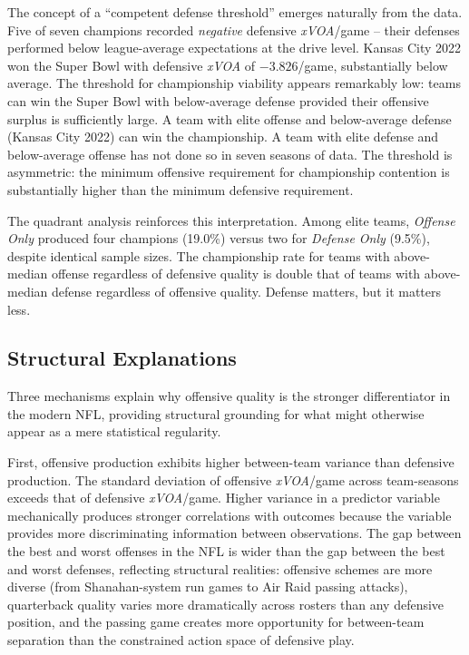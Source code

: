 \documentclass[12pt,a4paper]{article}
\newcommand{\xvoa}{\textit{xVOA}}
\begin{document}
The concept of a ``competent defense threshold'' emerges naturally from the data. Five of seven champions recorded \emph{negative} defensive \xvoa{}/game -- their defenses performed below league-average expectations at the drive level. Kansas City 2022 won the Super Bowl with defensive \xvoa{} of $-3.826$/game, substantially below average. The threshold for championship viability appears remarkably low: teams can win the Super Bowl with below-average defense provided their offensive surplus is sufficiently large. A team with elite offense and below-average defense (Kansas City 2022) can win the championship. A team with elite defense and below-average offense has not done so in seven seasons of data. The threshold is asymmetric: the minimum offensive requirement for championship contention is substantially higher than the minimum defensive requirement.

The quadrant analysis reinforces this interpretation. Among elite teams, \textit{Offense Only} produced four champions (19.0\%) versus two for \textit{Defense Only} (9.5\%), despite identical sample sizes. The championship rate for teams with above-median offense regardless of defensive quality is double that of teams with above-median defense regardless of offensive quality. Defense matters, but it matters less.

\subsection{Structural Explanations}
\label{sec:structural}

Three mechanisms explain why offensive quality is the stronger differentiator in the modern NFL, providing structural grounding for what might otherwise appear as a mere statistical regularity.

First, offensive production exhibits higher between-team variance than defensive production. The standard deviation of offensive \xvoa{}/game across team-seasons exceeds that of defensive \xvoa{}/game. Higher variance in a predictor variable mechanically produces stronger correlations with outcomes because the variable provides more discriminating information between observations. The gap between the best and worst offenses in the NFL is wider than the gap between the best and worst defenses, reflecting structural realities: offensive schemes are more diverse (from Shanahan-system run games to Air Raid passing attacks), quarterback quality varies more dramatically across rosters than any defensive position, and the passing game creates more opportunity for between-team separation than the constrained action space of defensive play.
\end{document}
